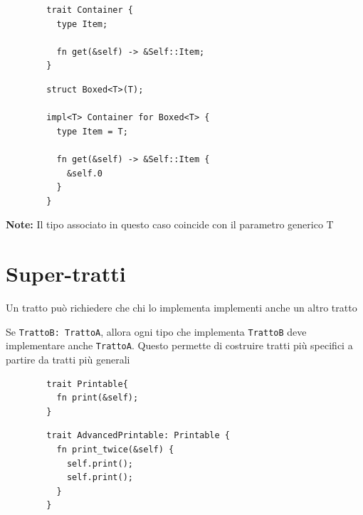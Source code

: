 \begin{center}
  \begin{minipage}{0.47\linewidth}
    \begin{verbatim}
        trait Container {
          type Item;
        
          fn get(&self) -> &Self::Item;
        }
    \end{verbatim}

  \end{minipage}
  \hfill
  \begin{minipage}{0.47\linewidth}
    \begin{verbatim}
        struct Boxed<T>(T);
        
        impl<T> Container for Boxed<T> {
          type Item = T;
        
          fn get(&self) -> &Self::Item {
            &self.0
          }
        }
    \end{verbatim}
  \end{minipage}
\end{center}

\begin{tcolorbox}
  \textbf{Note:} Il tipo associato in questo caso coincide con il parametro
  generico T
\end{tcolorbox}


\section{Super-tratti}
Un tratto può richiedere che chi lo implementa implementi anche un altro tratto

Se \verb|TrattoB: TrattoA|, allora ogni tipo che implementa \verb|TrattoB| deve implementare anche \verb|TrattoA|.
Questo permette di costruire tratti più specifici a partire da tratti più generali



\begin{center}
  \begin{minipage}{0.47\linewidth}
    \begin{verbatim}
        trait Printable{
          fn print(&self);
        }
\end{verbatim}

  \end{minipage}
  \hfill
  \begin{minipage}{0.47\linewidth}
    \begin{verbatim}
        trait AdvancedPrintable: Printable {
          fn print_twice(&self) {
            self.print();
            self.print();
          }
        }
    \end{verbatim}
  \end{minipage}
\end{center}




